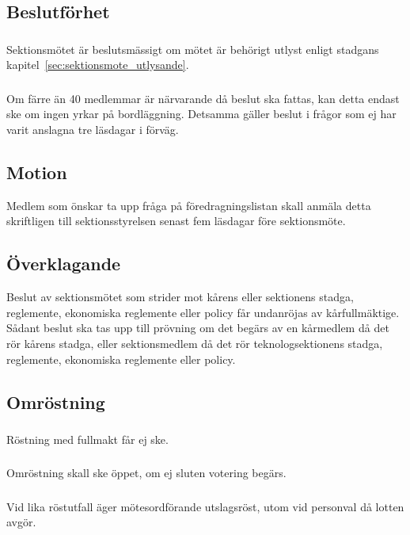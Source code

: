\documentclass[a4paper]{dtek}
\begin{document}
\subsection{Beslutförhet}
\subsubsection{}
Sektionsmötet är beslutsmässigt om mötet är behörigt utlyst enligt stadgans kapitel~\ref{sec:sektionsmote_utlysande}.
\subsubsection{}
Om färre än 40 medlemmar är närvarande då beslut ska fattas, kan detta endast ske om ingen yrkar på bordläggning. Detsamma gäller beslut i frågor som ej har varit anslagna tre läsdagar i förväg.
\subsection{Motion}
Medlem som önskar ta upp fråga på föredragningslistan skall anmäla detta skriftligen till sektionsstyrelsen senast fem läsdagar före sektionsmöte.
\subsection{Överklagande}
Beslut av sektionsmötet som strider mot kårens eller sektionens stadga, reglemente, ekonomiska reglemente eller policy får undanröjas av kårfullmäktige. Sådant beslut ska tas upp till prövning om det begärs av en kårmedlem då det rör kårens stadga, eller sektionsmedlem då det rör teknologsektionens stadga, reglemente, ekonomiska reglemente eller policy.
\subsection{Omröstning}
\subsubsection{}
Röstning med fullmakt får ej ske.
\subsubsection{}
Omröstning skall ske öppet, om ej sluten votering begärs.
\subsubsection{}
Vid lika röstutfall äger mötesordförande utslagsröst, utom vid personval då lotten avgör.
\end{document}
